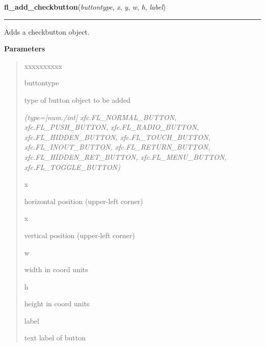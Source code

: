     \label{xformslib:library:fl_add_checkbutton}

    \vspace{0.5ex}

\hspace{.8\funcindent}\begin{boxedminipage}{\funcwidth}

    \raggedright \textbf{fl\_add\_checkbutton}(\textit{buttontype}, \textit{x}, \textit{y}, \textit{w}, \textit{h}, \textit{label})

    \vspace{-1.5ex}

    \rule{\textwidth}{0.5\fboxrule}
\setlength{\parskip}{2ex}
    Adds a checkbutton object.

\setlength{\parskip}{1ex}
      \textbf{Parameters}
      \vspace{-1ex}

      \begin{quote}
        \begin{Ventry}{xxxxxxxxxx}

          \item[buttontype]

          type of button object to be added

            {\it (type=[num./int] xfc.FL\_NORMAL\_BUTTON, xfc.FL\_PUSH\_BUTTON, 
xfc.FL\_RADIO\_BUTTON, xfc.FL\_HIDDEN\_BUTTON, xfc.FL\_TOUCH\_BUTTON, 
xfc.FL\_INOUT\_BUTTON, xfc.FL\_RETURN\_BUTTON, xfc.FL\_HIDDEN\_RET\_BUTTON,
xfc.FL\_MENU\_BUTTON, xfc.FL\_TOGGLE\_BUTTON)}

          \item[x]

          horizontal position (upper-left corner)

          \item[x]

          vertical position (upper-left corner)

          \item[w]

          width in coord units

          \item[h]

          height in coord units

          \item[label]

          text label of button


\end{Ventry}
\end{quote}
\end{boxedminipage}
